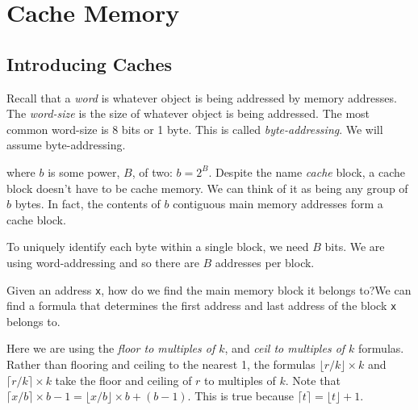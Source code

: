 
\chapter{Cache Memory}


\section{Introducing Caches}

Recall that a \textit{word} is whatever object is being addressed by memory addresses. 
The \textit{word-size} is the size of whatever object is being addressed. 
The most common word-size is 8 bits or 1 byte. 
This is called \textit{byte-addressing}. We will assume byte-addressing.  



where $b$ is some power, $B$, of two: $b = 2^{B}$. 
Despite the name \textit{cache} block, a cache block doesn't have to 
be cache memory. We can think of it as being any group of $b$ bytes. 
In fact, the contents of $b$ contiguous main memory addresses form 
a cache block.

To uniquely identify each byte within a single block, we need $B$ bits. 
We are using word-addressing and so there are $B$ addresses per block.

\begin{example}
Given an address \lstinline{x}, how do we find the main memory 
block it belongs to?We can find a formula that determines the first address 
and last address 
of the block \lstinline{x} belongs to.
\end{example}


Here we are using the \textit{floor to multiples of $k$},
and \textit{ceil to multiples of $k$} formulas.
Rather than flooring and ceiling to the nearest 1, the formulas
$\lfloor r/k \rfloor \times k$ and $\lceil r/k \rceil \times k$
take the floor and ceiling of $r$ to multiples of $k$. 
Note that $\lceil x/b \rceil \times b - 1 = \lfloor x/b \rfloor \times b + (b-1)$.
This is true because $\lceil t \rceil = \lfloor t \rfloor + 1$.



